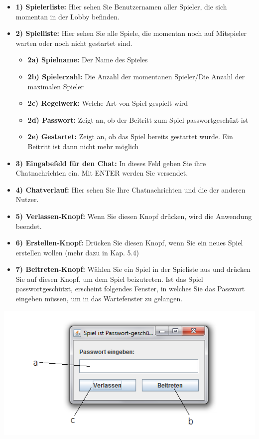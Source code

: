 \documentclass[titlepage,10pt,a4paper]{article}
\begin{document}
\begin{itemize}
	\item \textbf{1) Spielerliste:} Hier sehen Sie Benutzernamen aller Spieler, die sich momentan in der \gls{Lobby}  befinden.
	\item \textbf{2) Spielliste:} Hier sehen Sie alle Spiele, die momentan noch auf Mitspieler warten oder noch nicht gestartet sind.
	\begin{itemize}
		\item \textbf{2a) Spielname:} Der Name des Spieles
		\item \textbf{2b) Spielerzahl:} Die Anzahl der momentanen Spieler/Die Anzahl der maximalen Spieler
		\item \textbf{2c) Regelwerk:} Welche Art von Spiel gespielt wird
		\item \textbf{2d) Passwort:} Zeigt an, ob der Beitritt zum Spiel passwortgeschüzt ist
		\item \textbf{2e) Gestartet:} Zeigt an, ob das Spiel bereits gestartet wurde. Ein Beitritt ist dann nicht mehr möglich
	\end{itemize}
	\item \textbf{3) Eingabefeld für den Chat:} In dieses Feld geben Sie ihre Chatnachrichten ein. Mit ENTER werden Sie versendet.
	\item \textbf{4) Chatverlauf:} Hier sehen Sie Ihre Chatnachrichten und die der anderen Nutzer.
	\item \textbf{5) Verlassen-Knopf:} Wenn Sie diesen Knopf drücken, wird die Anwendung beendet.
	\item \textbf{6) Erstellen-Knopf:} Drücken Sie diesen Knopf, wenn Sie ein neues Spiel erstellen wollen (mehr dazu in Kap. 5.4)
	\item \textbf{7) Beitreten-Knopf:} Wählen Sie ein Spiel in der Spieliste aus und drücken Sie auf diesen Knopf, um dem Spiel beizutreten. Ist das Spiel passwortgeschützt, erscheint folgendes Fenster, in welches Sie das Passwort eingeben müssen, um in das \gls{Wartefenster} zu gelangen.
\end{itemize}
\includegraphics[width=\textwidth]{Passwort-Fenster}
\end{document}
